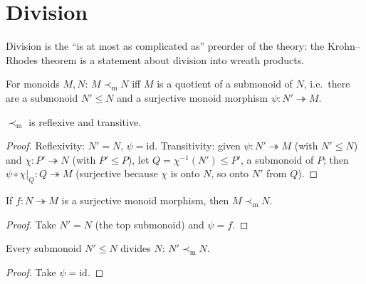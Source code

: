 \chapter{Division}\label{ch:division}

Division is the ``is at most as complicated as'' preorder of the theory:
the Krohn--Rhodes theorem is a statement about division into wreath
products.

\begin{definition}\label{def:mdiv}
  \leanok
  For monoids $M, N$: $M \prec_{\mathrm m} N$ iff $M$ is a quotient of a
  submonoid of $N$, i.e.\ there are a submonoid $N' \le N$ and a
  surjective monoid morphism $\psi : N' \twoheadrightarrow M$.
\end{definition}

\begin{lemma}[Preorder]\label{lem:mdiv-preorder}
  \leanok
  $\prec_{\mathrm m}$ is reflexive and transitive.
\end{lemma}
\begin{proof}
  \leanok
  Reflexivity: $N' = N$, $\psi = \mathrm{id}$. Transitivity: given
  $\psi : N' \twoheadrightarrow M$ (with $N' \le N$) and
  $\chi : P' \twoheadrightarrow N$ (with $P' \le P$), let
  $Q = \chi^{-1}(N') \le P'$, a submonoid of $P$; then
  $\psi \circ \chi|_Q : Q \twoheadrightarrow M$ (surjective because
  $\chi$ is onto $N$, so onto $N'$ from $Q$).
\end{proof}

\begin{lemma}\label{lem:mdiv-of-surjective}
  \leanok
  If $f : N \twoheadrightarrow M$ is a surjective monoid morphism, then
  $M \prec_{\mathrm m} N$.
\end{lemma}
\begin{proof}
  \leanok
  Take $N' = N$ (the top submonoid) and $\psi = f$.
\end{proof}

\begin{lemma}\label{lem:mdiv-of-submonoid}
  \leanok
  Every submonoid $N' \le N$ divides $N$: $N' \prec_{\mathrm m} N$.
\end{lemma}
\begin{proof}
  \leanok
  Take $\psi = \mathrm{id}$.
\end{proof}

